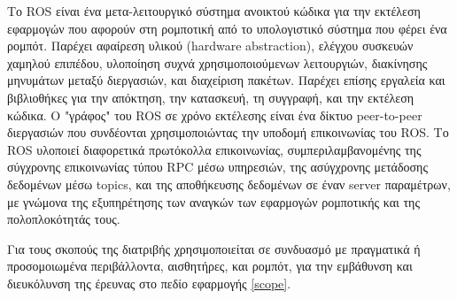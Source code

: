 Το ROS είναι ένα μετα-λειτουργικό σύστημα ανοικτού κώδικα για την εκτέλεση
εφαρμογών που αφορούν στη ρομποτική από το υπολογιστικό σύστημα που φέρει ένα
ρομπότ. Παρέχει αφαίρεση υλικού (hardware abstraction), ελέγχου συσκευών
χαμηλού επιπέδου, υλοποίηση συχνά χρησιμοποιούμενων λειτουργιών,
διακίνησης μηνυμάτων μεταξύ διεργασιών, και διαχείριση πακέτων. Παρέχει
επίσης εργαλεία και βιβλιοθήκες για την απόκτηση, την κατασκευή, τη συγγραφή,
και την εκτέλεση κώδικα. Ο "γράφος" του ROS σε χρόνο εκτέλεσης είναι ένα δίκτυο
peer-to-peer διεργασιών που συνδέονται χρησιμοποιώντας την υποδομή επικοινωνίας
του ROS. Το ROS υλοποιεί διαφορετικά πρωτόκολλα επικοινωνίας,
συμπεριλαμβανομένης της σύγχρονης επικοινωνίας τύπου RPC μέσω υπηρεσιών, της
ασύγχρονης μετάδοσης δεδομένων μέσω topics, και της αποθήκευσης δεδομένων σε
έναν server παραμέτρων, με γνώμονα της εξυπηρέτησης των αναγκών των εφαρμογών
ρομποτικής και της πολοπλοκότητάς τους.

Για τους σκοπούς της διατριβής χρησιμοποιείται σε συνδυασμό με πραγματικά
ή προσομοιωμένα περιβάλλοντα, αισθητήρες, και ρομπότ, για την εμβάθυνση και
διευκόλυνση της έρευνας στο πεδίο εφαρμογής \ref{scope}.
